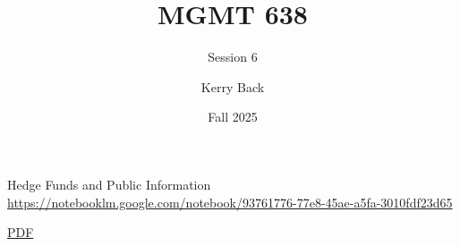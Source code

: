 \documentclass[aspectratio=169]{beamer}
\title{MGMT 638}
\subtitle{Session 6}
\author{Kerry Back}
\institute{}
\date{Fall 2025}
\begin{document}
\maketitle

\begin{frame}{Hedge Funds and Public Information}
\centering
\Large
\url{https://notebooklm.google.com/notebook/93761776-77e8-45ae-a5fa-3010fdf23d65}

\vspace{1em}

\href{https://mgmt638.kerryback.com/Crane_Crotty_Umar_MS_2023.pdf}{PDF}
\end{frame}
\end{document}
